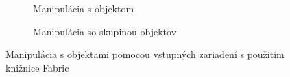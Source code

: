 \begin{figure}
	\centering
	\begin{subfigure}[b]{0.48\linewidth}	
		\caption{Manipulácia s objektom}
		\label{img:fabric-object-selection}
	\end{subfigure}
	\quad
	\begin{subfigure}[b]{0.48\linewidth}	
		\caption{Manipulácia so skupinou objektov}
		\label{img:fabric-group-selection}
	\end{subfigure}
	\caption[Fabric - ukážka manipulácie s objektami]{Manipulácia s objektami pomocou vstupných zariadení s použitím knižnice Fabric}
\end{figure}
\FloatBarrier

